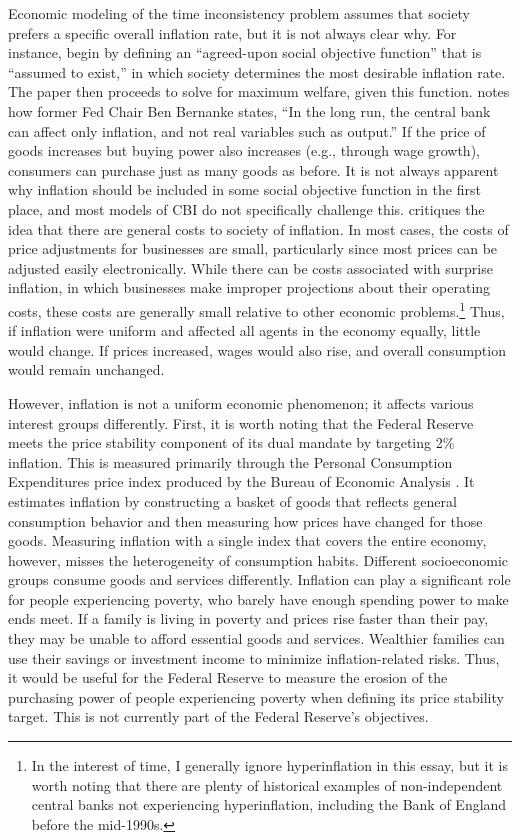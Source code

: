 \documentclass[12pt,a4paper]{article}
\begin{document}
\begin{doublespace}
Economic modeling of the time inconsistency problem assumes that society prefers a specific overall inflation rate, but it is not always clear why. For instance, \textcite[475]{kydland_rules_1977} begin by defining an ``agreed-upon social objective function'' that is ``assumed to exist,'' in which society determines the most desirable inflation rate. The paper then proceeds to solve for maximum welfare, given this function. \textcite[52]{downey_our_2025} notes how former Fed Chair Ben Bernanke states, ``In the long run, the central bank can affect only inflation, and not real variables such as output.'' If the price of goods increases but buying power also increases (e.g., through wage growth), consumers can purchase just as many goods as before. It is not always apparent why inflation should be included in some social objective function in the first place, and most models of CBI do not specifically challenge this. \textcite[58-61]{downey_our_2025} critiques the idea that there are general costs to society of inflation. In most cases, the costs of price adjustments for businesses are small, particularly since most prices can be adjusted easily electronically. While there can be costs associated with surprise inflation, in which businesses make improper projections about their operating costs, these costs are generally small relative to other economic problems.\footnote{In the interest of time, I generally ignore hyperinflation in this essay, but it is worth noting that there are plenty of historical examples of non-independent central banks not experiencing hyperinflation, including the Bank of England before the mid-1990s.} Thus, if inflation were uniform and affected all agents in the economy equally, little would change. If prices increased, wages would also rise, and overall consumption would remain unchanged. 

However, inflation is not a uniform economic phenomenon; it affects various interest groups differently. First, it is worth noting that the Federal Reserve meets the price stability component of its dual mandate by targeting 2\% inflation. This is measured primarily through the Personal Consumption Expenditures price index produced by the Bureau of Economic Analysis \parencite{federalreserve_inflation_pce_2024}. It estimates inflation by constructing a basket of goods that reflects general consumption behavior and then measuring how prices have changed for those goods. Measuring inflation with a single index that covers the entire economy, however, misses the heterogeneity of consumption habits. Different socioeconomic groups consume goods and services differently. Inflation can play a significant role for people experiencing poverty, who barely have enough spending power to make ends meet. If a family is living in poverty and prices rise faster than their pay, they may be unable to afford essential goods and services. Wealthier families can use their savings or investment income to minimize inflation-related risks. Thus, it would be useful for the Federal Reserve to measure the erosion of the purchasing power of people experiencing poverty when defining its price stability target. This is not currently part of the Federal Reserve's objectives.


\end{doublespace}
\end{document}
